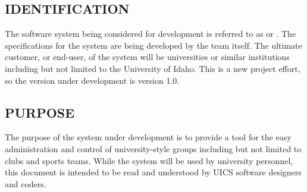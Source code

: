\documentclass[12pt]{report}
\begin{document}
 \subsection{IDENTIFICATION}
  The software system being considered for development is referred to as  or . The specifications for the system are being developed by the team itself. The ultimate customer, or end-user, of the system will be universities or similar institutions including but not limited to the University of Idaho. This is a new project effort, so the version under development is version 1.0.
 \subsection{PURPOSE}
  The purpose of the system under development is to provide a tool for the easy administration and control of university-style groups including but not limited to clubs and sports teams. While the system will be used by university personnel, this document is intended to be read and understood by UICS software designers and coders.
\end{document}
